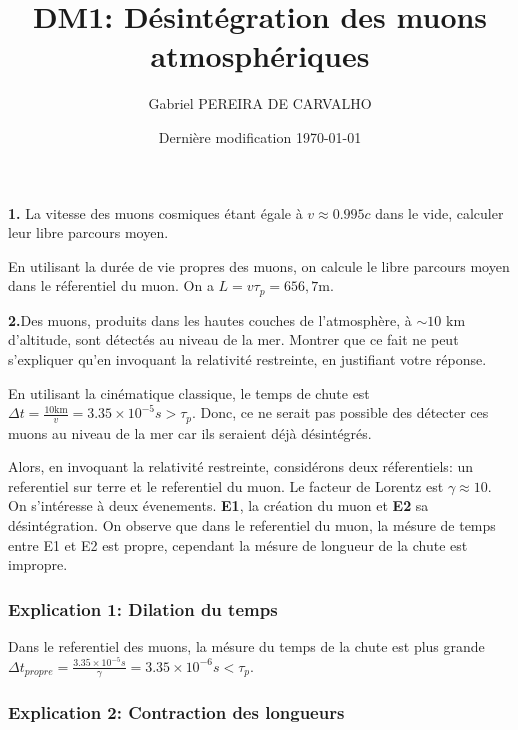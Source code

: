 \documentclass[french]{article}
\begin{document}
	\title{DM1: Désintégration des muons atmosphériques}
	\author{Gabriel PEREIRA DE CARVALHO}
	\date{Dernière modification \today}
	
	\maketitle
	
	\begin{tcolorbox}[colback=gray!5!white,colframe=gray!75!black]
		\textbf{1.} La vitesse des muons cosmiques étant égale à $v \approx 0.995c$ dans le vide, calculer leur libre parcours moyen. 
	\end{tcolorbox}

	En utilisant la durée de vie propres des muons, on calcule le libre parcours moyen dans le réferentiel du muon. On a $L = v \tau_p = 656,7 \mathrm{m}$.

	\begin{tcolorbox}[colback=gray!5!white,colframe=gray!75!black]
		\textbf{2.}Des muons, produits dans les hautes couches de l'atmosphère, à $\sim 10$ km d'altitude, sont détectés au niveau de la mer. Montrer que ce fait ne peut s'expliquer qu'en invoquant la relativité restreinte, en justifiant votre réponse.
	\end{tcolorbox}

	En utilisant la cinématique classique, le temps de chute est $\Delta t = \frac{10 \mathrm{km}}{v} = 3.35 \times 10^{-5}s > \tau_p$. Donc, ce ne serait pas possible des détecter ces muons au niveau de la mer car ils seraient déjà désintégrés.

	Alors, en invoquant la relativité restreinte, considérons deux réferentiels: un referentiel sur terre et le referentiel du muon. Le facteur de Lorentz est $\gamma \approx 10$. On s'intéresse à deux évenements. \textbf{E1}, la création du muon et \textbf{E2} sa désintégration. On observe que dans le referentiel du muon, la mésure de temps entre E1 et E2 est propre, cependant la mésure de longueur de la chute est impropre.

	\subsubsection*{Explication 1: Dilation du temps}
	
	Dans le referentiel des muons, la mésure du temps de la chute est plus grande $\Delta t_{propre} = \frac{3.35 \times 10^{-5}s}{\gamma} = 3.35 \times 10^{-6}s < \tau_p$.
	
	\subsubsection*{Explication 2: Contraction des longueurs}
	
\end{document}
